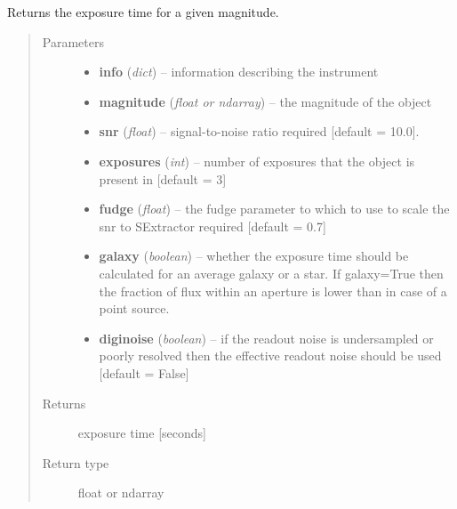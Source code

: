 \documentclass[a4paper,12pt,english]{sphinxmanual}
\begin{document}
\begin{fulllineitems}
\label{ETC:analysis.ETC.exposureTime}
Returns the exposure time for a given magnitude.
\begin{quote}\begin{description}
\item[{Parameters}] \leavevmode\begin{itemize}
\item {} 
\textbf{info} (\emph{dict}) -- information describing the instrument

\item {} 
\textbf{magnitude} (\emph{float or ndarray}) -- the magnitude of the object

\item {} 
\textbf{snr} (\emph{float}) -- signal-to-noise ratio required {[}default = 10.0{]}.

\item {} 
\textbf{exposures} (\emph{int}) -- number of exposures that the object is present in {[}default = 3{]}

\item {} 
\textbf{fudge} (\emph{float}) -- the fudge parameter to which to use to scale the snr to SExtractor required {[}default = 0.7{]}

\item {} 
\textbf{galaxy} (\emph{boolean}) -- whether the exposure time should be calculated for an average galaxy or a star.
If galaxy=True then the fraction of flux within an aperture is lower than in case of a point source.

\item {} 
\textbf{diginoise} (\emph{boolean}) -- if the readout noise is undersampled or poorly resolved then the effective readout noise
should be used {[}default = False{]}

\end{itemize}

\item[{Returns}] \leavevmode
exposure time {[}seconds{]}

\item[{Return type}] \leavevmode
float or ndarray

\end{description}\end{quote}

\end{fulllineitems}
\end{document}
